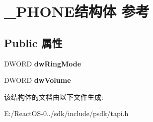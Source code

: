 \hypertarget{struct___p_h_o_n_e}{}\section{\+\_\+\+P\+H\+O\+N\+E结构体 参考}
\label{struct___p_h_o_n_e}
\subsection*{Public 属性}
\begin{DoxyCompactItemize}
\item 
\mbox{\label{struct___p_h_o_n_e_a8ee452a582ee32e9b49b912fd03a858d}} 
D\+W\+O\+RD {\bfseries dw\+Ring\+Mode}
\item 
\mbox{\label{struct___p_h_o_n_e_a814e3903c9376355f584f58d05f5baea}} 
D\+W\+O\+RD {\bfseries dw\+Volume}
\end{DoxyCompactItemize}


该结构体的文档由以下文件生成\+:\begin{DoxyCompactItemize}
\item 
E\+:/\+React\+O\+S-\/0../sdk/include/psdk/tapi.\+h\end{DoxyCompactItemize}
